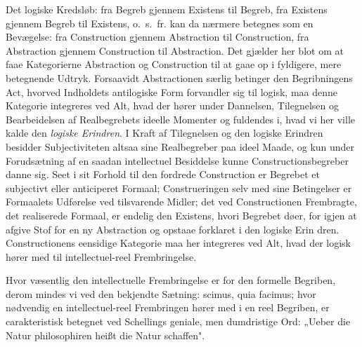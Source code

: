\documentclass[12pt]{book}
\newcommand{\opage}[1]{\marginnote{\footnotesize\textit{[#1]}}}
\begin{document}
Det logiske Kredsløb: fra Begreb gjennem Existens til Begreb, fra Existens gjennem Begreb til
Existens, o.\ s.\ fr. kan da nærmere betegnes som en Bevægelse: fra Construction gjennem
Abstraction til Construction, fra Abstraction gjennem Construction til Abstraction. Det gjælder
her blot om at faae Kategorierne Abstraction og Construction til at gaae op i fyldigere, mere
betegnende Udtryk. Forsaavidt Abstractionen særlig betinger den Begribningens Act, hvorved
Indholdets antilogiske Form forvandler sig til logisk, maa denne Kategorie integreres ved Alt,
hvad der hører under Dannelsen, Tilegnelsen og Bearbeidelsen af Realbegrebets ideelle Momenter
og fuldendes i, hvad vi her ville kalde den \emph{logiske Erindren}. I Kraft af Tilegnelsen og
den logiske Erindren besidder Subjectiviteten altsaa sine Realbegreber paa ideel Maade, og kun
under Forudsætning af en saadan intellectuel Besiddelse kunne Constructionsbegreber danne sig.
Seet i sit Forhold til den fordrede Construction er Begrebet et subjectivt eller anticiperet
Formaal; Construeringen selv med sine Betingelser er Formaalets Udførelse ved tilsvarende
Midler; det ved Constructionen Frembragte, det realiserede Formaal, er endelig den Existens,
hvori Begrebet døer, for igjen at afgive Stof for en ny Abstraction og opstaae forklaret i den
logiske Erin%
\opage{170} dren. Constructionens eensidige Kategorie maa her integreres ved Alt, hvad der logisk hører med
til intellectuel-reel Frembringelse.

Hvor væsentlig den intellectuelle Frembringelse er for den formelle Begriben, derom mindes vi
ved den bekjendte Sætning: scimus, quia facimus; hvor nødvendig en intellectuel-reel
Frembringen hører med i en reel Begriben, er carakteristisk betegnet ved Schellings geniale, men
dumdristige Ord: „Ueber die Natur philosophiren heißt die Natur schaffen".
\end{document}
